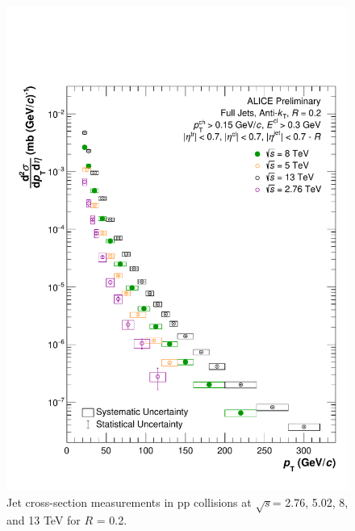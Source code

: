 \documentclass[ALICE]{ALICE_analysis_notes}
\newcommand{\s}{$\sqrt{s}$\xspace}
\newcommand{\pp}{pp\xspace}
\begin{document}
\begin{appendix}
\begin{figure}[h!]
    \centering
    \includegraphics[width=15cm]{figures/EnergyComparisons/SpectrumComparison_R02.pdf}
    \caption{Jet cross-section measurements in \pp collisions at \s = 2.76, 5.02, 8, and 13 TeV for $R$ = 0.2.}
    \label{fig:appSpecCompareR02}
\end{figure}


\end{appendix}
\end{document}
